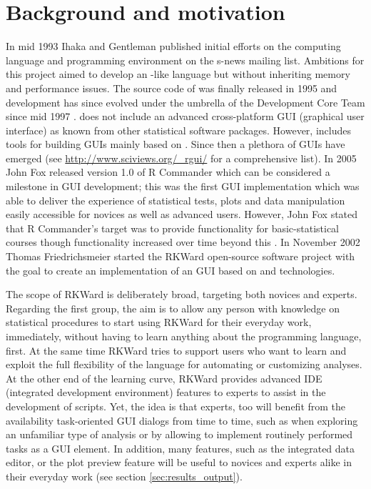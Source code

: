 \section{Background and motivation}
\label{background}
In mid 1993 Ihaka and Gentleman published initial efforts on the computing
language and programming environment  on the s-news mailing list. Ambitions for
this project aimed to develop an -like language but without inheriting memory
and performance issues. The source code of  was finally released in 1995 and
development has since evolved under the umbrella of the  Development Core Team
since mid 1997 \citep{RDCT2001, RDCT2010, Ihaka_Gentlemen_1993}.
 does not include an advanced cross-platform GUI (graphical user interface) as known from other
statistical software packages. However,  includes tools for building GUIs
mainly based on  \citep{Dalgaard2001, Dalgaard2002}. Since then a
plethora of  GUIs have emerged (see \url{http://www.sciviews.org/_rgui/} for a
comprehensive list). In 2005 John Fox released version 1.0 of R Commander which
can be considered a milestone in  GUI development; this was the first GUI
implementation which was able to deliver the experience of statistical tests,
plots and data manipulation easily accessible for  novices as well as advanced
users. However, John Fox stated that R Commander's target was to provide
functionality for basic-statistical courses though functionality increased over
time beyond this \citep{Fox2005, Fox2007}. In November 2002 Thomas Friedrichsmeier
started the RKWard open-source software project with the goal to create an
implementation of an  GUI based on  and  technologies.

The scope of RKWard is deliberately broad, targeting both  novices and experts.
Regarding the first group, the aim is to allow any person with knowledge on
statistical procedures to start using RKWard for their everyday work,
immediately, without having to learn anything about the  programming language,
first. At the same time RKWard tries to support users who want to learn and
exploit the full flexibility of the  language for automating or customizing
analyses. At the other end of the learning curve, RKWard provides advanced IDE (integrated development environment)
features to  experts to assist in the development of  scripts. Yet, the idea
is that  experts, too will benefit from the availability task-oriented GUI
dialogs from time to time, such as when exploring an unfamiliar type of analysis
or by allowing to implement routinely performed tasks as a GUI element. In
addition, many features, such as the integrated data editor, or the plot preview
feature will be useful to  novices and  experts alike in their everyday work
(see section \ref{sec:results_output}).

